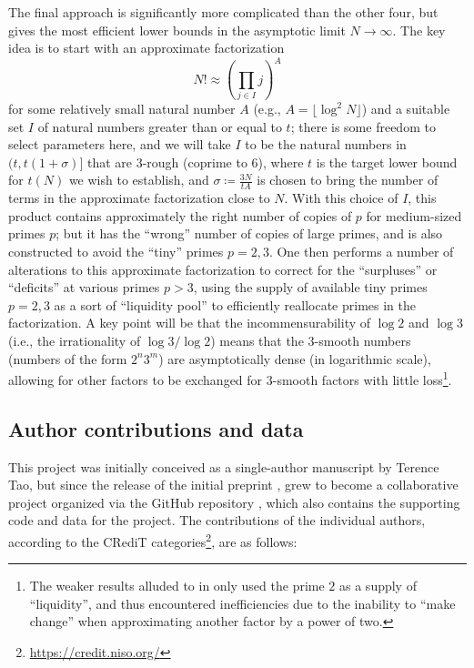\documentclass[12pt,a4paper,reqno]{amsart}
\numberwithin{equation}{section}
\theoremstyle{plain}
\theoremstyle{definition}
\begin{document}
The final approach is significantly more complicated than the other four, but gives the most efficient lower bounds in the asymptotic limit $N \to \infty$.  The key idea is to start with an approximate factorization
$$ N! \approx \left(\prod_{j \in I} j\right)^A$$
for some relatively small natural number $A$ (e.g., $A = \lfloor \log^2 N \rfloor$) and a suitable set $I$ of natural numbers greater than or equal to $t$; there is some freedom to select parameters here, and we will take $I$ to be the natural numbers in $(t, t(1+\sigma)]$ that are $3$-rough (coprime to $6$), where $t$ is the target lower bound for $t(N)$ we wish to establish, and $\sigma \coloneqq \frac{3N}{tA}$ is chosen to bring the number of terms in the approximate factorization close to $N$.  With this choice of $I$, this product contains approximately the right number of copies of $p$ for medium-sized primes $p$; but it has the ``wrong'' number of copies of large primes, and is also constructed to avoid the ``tiny'' primes $p=2,3$.  One then performs a number of alterations to this approximate factorization to correct for the ``surpluses'' or ``deficits'' at various primes $p>3$, using the supply of available tiny primes $p=2,3$ as a sort of ``liquidity pool'' to efficiently reallocate primes in the factorization.  A key point will be that the incommensurability of $\log 2$ and $\log 3$ (i.e., the irrationality of $\log 3/\log 2$) means that the $3$-smooth numbers (numbers of the form $2^n 3^m$) are asymptotically dense (in logarithmic scale), allowing for other factors to be exchanged for $3$-smooth factors with little loss\footnote{The weaker results alluded to in  only used the prime $2$ as a supply of ``liquidity'', and thus encountered inefficiencies due to the inability to ``make change'' when approximating another factor by a power of two.}.




\subsection{Author contributions and data}

This project was initially conceived as a single-author manuscript by Terence Tao, but since the release of the initial preprint \cite{tao}, grew to become a collaborative project organized via the GitHub repository \cite{github}, which also contains the supporting code and data for the project.  The contributions of the individual authors, according to the CRediT categories\footnote{\url{https://credit.niso.org/}}, are as follows:
\end{document}
